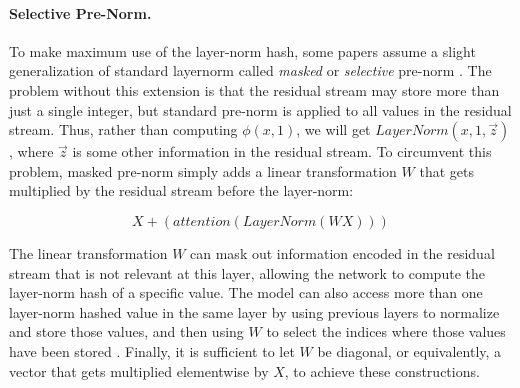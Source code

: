 \paragraph{Selective Pre-Norm.}
To make maximum use of the layer-norm hash, some papers assume a slight generalization of standard layernorm called \emph{masked} or \emph{selective} pre-norm \citep{merrill-sabharwal-2024-cot,merrill2024little}.
The problem without this extension is that the residual stream may store more than just a single integer, but standard pre-norm is applied to all values in the residual stream. Thus, rather than computing $\phi(x, 1)$, we will get $LayerNorm(x, 1, \vec z)$, where $\vec z$ is some other information in the residual stream.
To circumvent this problem, masked pre-norm simply adds a linear transformation $W$ that gets multiplied by the residual stream before the layer-norm:

\[X+(attention(LayerNorm(W X)))\]

The linear transformation $W$ can mask out information encoded in the residual stream that is not relevant at this layer, allowing the network to compute the layer-norm hash of a specific value.
The model can also access more than one layer-norm hashed value in the same layer by using previous layers to normalize and store those values, and then using $W$ to select the indices where those values have been stored \citep{merrill-sabharwal-2024-cot}.
Finally, it is sufficient to let $W$ be diagonal, or equivalently, a vector that gets multiplied elementwise by $X$, to achieve these constructions.